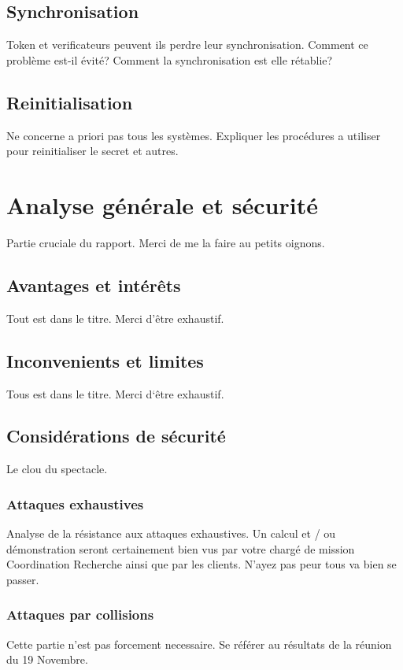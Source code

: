 \documentclass{../res/univ-projet}
\begin{document}
  \subsection{Synchronisation}
  Token et verificateurs peuvent ils perdre leur synchronisation. Comment ce problème est-il évité? Comment la synchronisation est elle rétablie?
  
  \subsection{Reinitialisation}
  Ne concerne a priori pas tous les systèmes. Expliquer les procédures a utiliser pour reinitialiser le secret et autres.
  
\section{Analyse générale et sécurité}
Partie cruciale du rapport. Merci de me la faire au petits oignons.

  \subsection{Avantages et intér\^ets}
  Tout est dans le titre. Merci d'\^etre exhaustif.
  
  \subsection{Inconvenients et limites}
  Tous est dans le titre. Merci d`\^etre exhaustif.
  
  \subsection{Considérations de sécurité}
  Le clou du spectacle.
    \subsubsection{Attaques exhaustives}
    Analyse de la résistance aux attaques exhaustives. Un calcul et / ou démonstration seront certainement bien vus par votre chargé de mission 
    \og{}Coordination Recherche\fg{} ainsi que par les clients. N'ayez pas peur tous va bien se passer.
    
    \subsubsection{Attaques par collisions}
    Cette partie n'est pas forcement necessaire. Se référer au résultats de la réunion du 19 Novembre.
    
\end{document}
